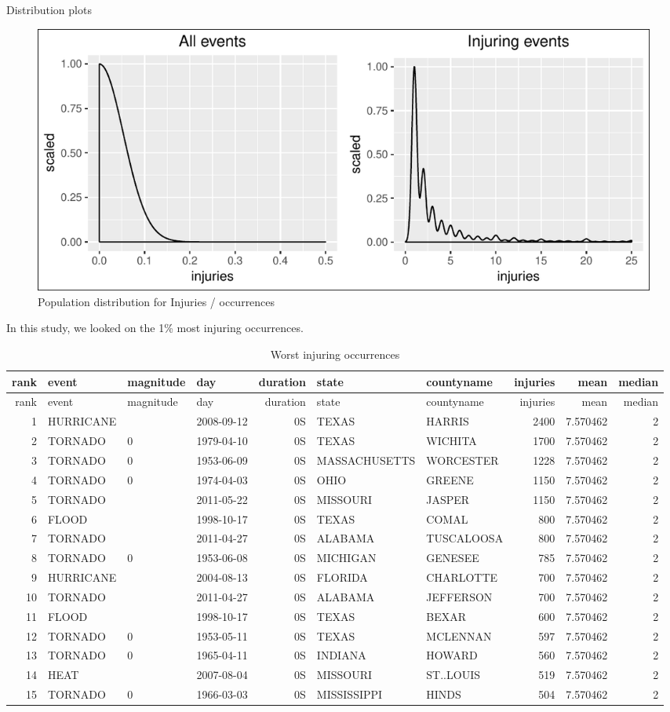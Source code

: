 \documentclass[]{article}
\begin{document}
Distribution plots

\begin{figure}[htbp]
\centering
\includegraphics{readme_files/figure-latex/inj-distribution-1.pdf}
\caption{Population distribution for Injuries / occurrences}
\end{figure}

In this study, we looked on the 1\% most injuring occurrences.

\begin{longtable}[]{@{}rlllrllrrr@{}}
\caption{Worst injuring occurrences}\tabularnewline
\toprule
rank & event & magnitude & day & duration & state & countyname &
injuries & mean & median\tabularnewline
\midrule
\endfirsthead
\toprule
rank & event & magnitude & day & duration & state & countyname &
injuries & mean & median\tabularnewline
\midrule
\endhead
1 & HURRICANE & & 2008-09-12 & 0S & TEXAS & HARRIS & 2400 & 7.570462 &
2\tabularnewline
2 & TORNADO & 0 & 1979-04-10 & 0S & TEXAS & WICHITA & 1700 & 7.570462 &
2\tabularnewline
3 & TORNADO & 0 & 1953-06-09 & 0S & MASSACHUSETTS & WORCESTER & 1228 &
7.570462 & 2\tabularnewline
4 & TORNADO & 0 & 1974-04-03 & 0S & OHIO & GREENE & 1150 & 7.570462 &
2\tabularnewline
5 & TORNADO & & 2011-05-22 & 0S & MISSOURI & JASPER & 1150 & 7.570462 &
2\tabularnewline
6 & FLOOD & & 1998-10-17 & 0S & TEXAS & COMAL & 800 & 7.570462 &
2\tabularnewline
7 & TORNADO & & 2011-04-27 & 0S & ALABAMA & TUSCALOOSA & 800 & 7.570462
& 2\tabularnewline
8 & TORNADO & 0 & 1953-06-08 & 0S & MICHIGAN & GENESEE & 785 & 7.570462
& 2\tabularnewline
9 & HURRICANE & & 2004-08-13 & 0S & FLORIDA & CHARLOTTE & 700 & 7.570462
& 2\tabularnewline
10 & TORNADO & & 2011-04-27 & 0S & ALABAMA & JEFFERSON & 700 & 7.570462
& 2\tabularnewline
11 & FLOOD & & 1998-10-17 & 0S & TEXAS & BEXAR & 600 & 7.570462 &
2\tabularnewline
12 & TORNADO & 0 & 1953-05-11 & 0S & TEXAS & MCLENNAN & 597 & 7.570462 &
2\tabularnewline
13 & TORNADO & 0 & 1965-04-11 & 0S & INDIANA & HOWARD & 560 & 7.570462 &
2\tabularnewline
14 & HEAT & & 2007-08-04 & 0S & MISSOURI & ST..LOUIS & 519 & 7.570462 &
2\tabularnewline
15 & TORNADO & 0 & 1966-03-03 & 0S & MISSISSIPPI & HINDS & 504 &
7.570462 & 2\tabularnewline
\bottomrule
\end{longtable}
\end{document}
